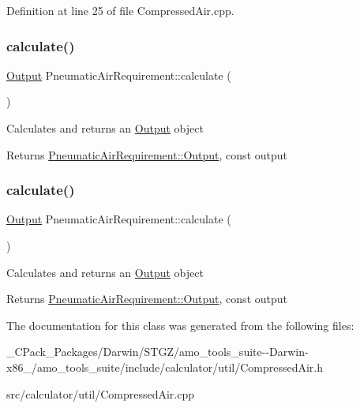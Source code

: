 Definition at line 25 of file Compressed\+Air.\+cpp.

\mbox{\label{class_pneumatic_air_requirement_ad49d3ecb061cc5a40aa2dc08432be04d}} 
\subsubsection{\texorpdfstring{calculate()}{calculate()}\hspace{0.1cm}{\footnotesize\ttfamily [2/3]}}
{\footnotesize\ttfamily \hyperlink{class_pneumatic_air_requirement_1_1_output}{Output} Pneumatic\+Air\+Requirement\+::calculate (\begin{DoxyParamCaption}{ }\end{DoxyParamCaption})}

Calculates and returns an \hyperlink{class_pneumatic_air_requirement_1_1_output}{Output} object \begin{DoxyReturn}{Returns}
\hyperlink{class_pneumatic_air_requirement_1_1_output}{Pneumatic\+Air\+Requirement\+::\+Output}, const output 
\end{DoxyReturn}
\mbox{\label{class_pneumatic_air_requirement_ad49d3ecb061cc5a40aa2dc08432be04d}} 
\subsubsection{\texorpdfstring{calculate()}{calculate()}\hspace{0.1cm}{\footnotesize\ttfamily [3/3]}}
{\footnotesize\ttfamily \hyperlink{class_pneumatic_air_requirement_1_1_output}{Output} Pneumatic\+Air\+Requirement\+::calculate (\begin{DoxyParamCaption}{ }\end{DoxyParamCaption})}

Calculates and returns an \hyperlink{class_pneumatic_air_requirement_1_1_output}{Output} object \begin{DoxyReturn}{Returns}
\hyperlink{class_pneumatic_air_requirement_1_1_output}{Pneumatic\+Air\+Requirement\+::\+Output}, const output 
\end{DoxyReturn}


The documentation for this class was generated from the following files\+:\begin{DoxyCompactItemize}
\item 
\+\_\+\+C\+Pack\+\_\+\+Packages/\+Darwin/\+S\+T\+G\+Z/amo\+\_\+tools\+\_\+suite-\/-\/\+Darwin-\/x86\+\_/amo\+\_\+tools\+\_\+suite/include/calculator/util/Compressed\+Air.\+h\item 
src/calculator/util/Compressed\+Air.\+cpp\end{DoxyCompactItemize}
